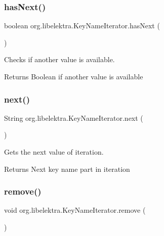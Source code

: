 \subsubsection{\texorpdfstring{has\+Next()}{hasNext()}}
{\footnotesize\ttfamily boolean org.\+libelektra.\+Key\+Name\+Iterator.\+has\+Next (\begin{DoxyParamCaption}{ }\end{DoxyParamCaption})\hspace{0.3cm}{\ttfamily [inline]}}



Checks if another value is available. 

\begin{DoxyReturn}{Returns}
Boolean if another value is available 
\end{DoxyReturn}
\mbox{\label{classorg_1_1libelektra_1_1KeyNameIterator_af97f8c817570172eb67e121d9cbf68a2}} 
\subsubsection{\texorpdfstring{next()}{next()}}
{\footnotesize\ttfamily String org.\+libelektra.\+Key\+Name\+Iterator.\+next (\begin{DoxyParamCaption}{ }\end{DoxyParamCaption})\hspace{0.3cm}{\ttfamily [inline]}}



Gets the next value of iteration. 

\begin{DoxyReturn}{Returns}
Next key name part in iteration 
\end{DoxyReturn}
\mbox{\label{classorg_1_1libelektra_1_1KeyNameIterator_aed2ee18e452c6e5efb893444dcccfda3}} 
\subsubsection{\texorpdfstring{remove()}{remove()}}
{\footnotesize\ttfamily void org.\+libelektra.\+Key\+Name\+Iterator.\+remove (\begin{DoxyParamCaption}{ }\end{DoxyParamCaption})\hspace{0.3cm}{\ttfamily [inline]}}



